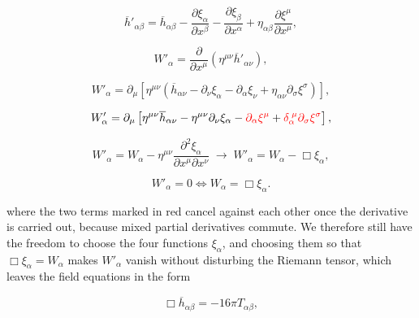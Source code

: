     \begin{equation}
        \overline{h}'_{\alpha\beta}=\overline{h}_{\alpha\beta} - \frac{\partial \xi_{\alpha}}{\partial x^{\beta}} - \frac{\partial \xi_{\beta}}{\partial x^{\alpha}} + \eta_{\alpha\beta}\frac{\partial \xi^{\mu}}{\partial x^{\mu}},
    \end{equation}

    \begin{equation}
        W'_{\alpha} = \frac{\partial}{\partial x^{\mu}}\left(\eta^{\mu\nu}\overline{h}'_{\alpha\nu} \right),
    \end{equation}

    \begin{equation}
        W'_{\alpha}=\partial_{\mu}\left[\eta^{\mu\nu}\left(\overline{h}_{\alpha\nu} - \partial_{\nu}\xi_{\alpha}-\partial_{\alpha}\xi_{\nu}+\eta_{\alpha\nu}\partial_{\sigma}\xi^{\sigma} \right)\right],
    \end{equation}

    \begin{equation}
        W'_{\alpha} = \partial_{\mu}\left[\eta^{\mu\nu}\overline{h}_{\alpha\nu} - \eta^{\mu\nu}\partial_{\nu}\xi_{\alpha} - {\color{red}\partial_{\alpha}\xi^{\mu}} + {\color{red}\delta_{\alpha}^{\;\mu}\partial_{\sigma}\xi^{\sigma}} \right],
    \end{equation}

    \begin{equation}
        W'_{\alpha} = W_{\alpha}-\eta^{\mu\nu}\frac{\partial^2\xi_{\alpha}}{\partial x^{\mu}\partial x^{\nu}} \;\rightarrow\;W'_{\alpha} = W_{\alpha}-\Box \xi_{\alpha},
    \end{equation}

    \begin{equation}
        W'_{\alpha}=0 \iff W_{\alpha}=\Box\xi_{\alpha}.
    \end{equation}

    where the two terms marked in red cancel against each other once the derivative is carried out, because mixed partial derivatives commute. We therefore still have the freedom to choose the four functions $\xi_{\alpha}$, and choosing them so that $\Box\xi_{\alpha}=W_{\alpha}$ makes $W'_{\alpha}$ vanish without disturbing the Riemann tensor, which leaves the field equations in the form

    \begin{equation}
        \Box\overline{h}_{\alpha\beta} = -16\pi T_{\alpha\beta},
    \end{equation}

